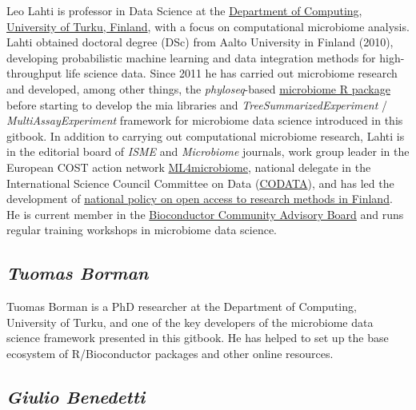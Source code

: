 \documentclass[
]{book}
\begin{document}
Leo Lahti is professor in Data Science at the \href{https://datascience.utu.fi/}{Department of Computing, University of Turku, Finland}, with a focus on computational microbiome analysis. Lahti obtained doctoral degree (DSc) from Aalto University in Finland (2010), developing probabilistic machine learning and data integration methods for high-throughput life science data. Since 2011 he has carried out microbiome research and developed, among other things, the \emph{phyloseq}-based \href{https://bioconductor.org/packages/release/bioc/html/microbiome.html}{microbiome R package} before starting to develop the mia libraries and \emph{TreeSummarizedExperiment} / \emph{MultiAssayExperiment} framework for microbiome data science introduced in this gitbook. In addition to carrying out computational microbiome research, Lahti is in the editorial board of \emph{ISME} and \emph{Microbiome} journals, work group leader in the European COST action network \href{https://ml4microbiome.eu/}{ML4microbiome}, national delegate in the International Science Council Committee on Data (\href{https://codata.org/}{CODATA}), and has led the development of \href{https://avointiede.fi/en/policies-materials/policies-open-science-and-research-finland/policy-open-research-data-and-methods}{national policy on open access to research methods in Finland}. He is current member in the \href{https://bioconductor.org/about/community-advisory-board/}{Bioconductor Community Advisory Board} and runs regular training workshops in microbiome data science.

\hypertarget{tuomas-borman}{%
\subsection*{\texorpdfstring{\emph{Tuomas Borman}}{Tuomas Borman}}\label{tuomas-borman}}

Tuomas Borman is a PhD researcher at the Department of Computing, University of Turku, and one of the key developers of the microbiome data science framework presented in this gitbook. He has helped to set up the base ecosystem of R/Bioconductor packages and other online resources.

\hypertarget{giulio-benedetti}{%
\subsection*{\texorpdfstring{\emph{Giulio Benedetti}}{Giulio Benedetti}}\label{giulio-benedetti}}
\end{document}
